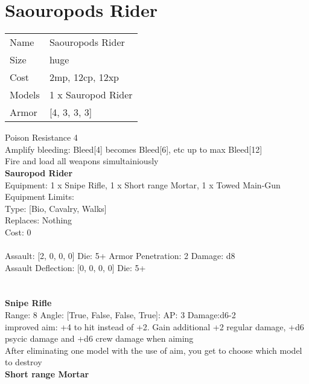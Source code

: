 \pagebreak\pagebreak

\section{ Saouropods Rider }

\begin{tabular}{ll}
  Name & Saouropods Rider \\
  Size & huge\\
  Cost & 2mp, 12cp, 12xp\\
  Models & 1 x Sauropod Rider\\
  Armor & [4, 3, 3, 3]\\
\end{tabular}

\noindent Poison Resistance 4\\ 
Amplify bleeding: Bleed[4] becomes Bleed[6], etc up to max Bleed[12]\\ 
Fire and load all weapons simultainiously\\ 


{\bf Sauropod Rider } \\
Equipment: 1 x Snipe Rifle, 1 x Short range Mortar, 1 x Towed Main-Gun \\
Equipment Limits:  \\
Type: [Bio, Cavalry, Walks] \\
Replaces: Nothing \\
Cost: 0\\
\ \\
Assault: [2, 0, 0, 0] Die: 5+ Armor Penetration: 2 Damage: d8 \\
Assault Deflection: [0, 0, 0, 0] Die: 5+\\
\indent  
\ \\

\ \\
{\bf Snipe Rifle } \\



Range: 8  Angle: [True, False, False, True]: AP: 3 Damage:d6-2 \\
improved aim: +4 to hit instead of +2. Gain additional +2 regular damage, +d6 psycic damage and +d6 crew damage when aiming\\ 
After eliminating one model with the use of aim, you get to choose which model to destroy\\ 




{\bf Short range Mortar } \\



